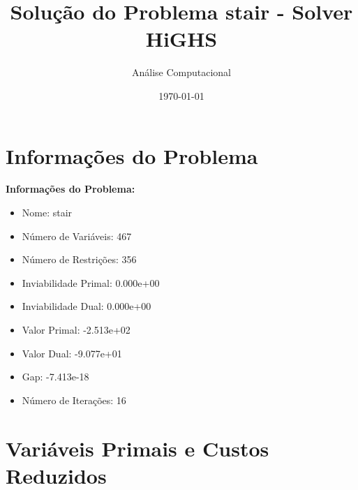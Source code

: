 \documentclass[12pt]{article}
\title{Solução do Problema stair - Solver HiGHS}
\author{Análise Computacional}
\date{\today}
\begin{document}
\maketitle

\section{Informações do Problema}

\textbf{Informações do Problema:}
\begin{itemize}
\item Nome: stair
\item Número de Variáveis: 467
\item Número de Restrições: 356
\item Inviabilidade Primal: 0.000e+00
\item Inviabilidade Dual: 0.000e+00
\item Valor Primal: -2.513e+02
\item Valor Dual: -9.077e+01
\item Gap: -7.413e-18
\item Número de Iterações: 16
\end{itemize}


\section{Variáveis Primais e Custos Reduzidos}
\end{document}
